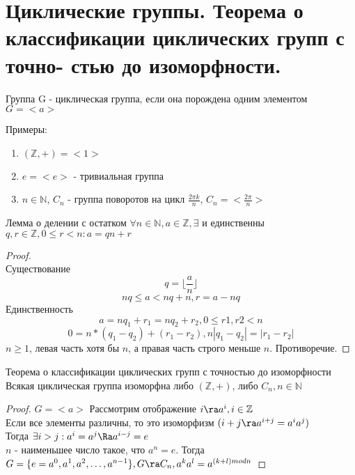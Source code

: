 \section{Циклические группы. Теорема о классификации циклических групп с точно-
стью до изоморфности.}
\begin{Def}
	Группа G - циклическая группа, если она порождена одним элементом
	$G = <a>$
\end{Def}

Примеры:
\begin{enumerate}
	\item $(\mathbb{Z}, +) = <1>$
	\item ${e} = <e>$ - тривиальная группа
	\item $n \in \mathbb{N}$, $C_n$ - группа поворотов на цикл $\frac{2\pi k}{n}$, $C_n = <\frac{2\pi}{n}>$
\end{enumerate}

\begin{theorem}{Лемма о делении с остатком}
	$\forall n \in \mathbb{N}, a \in \mathbb{Z}, \exists$ и единственны $q, r \in \mathbb{Z},  0 \leqslant r < n: a = qn + r$
\end{theorem}
\begin{proof}
\\	Существование
	$$q = \lfloor \frac{a}{n} \rfloor$$
	$$nq \leqslant a < nq + n, r = a - nq$$
	Единственность
	$$a = nq_1 + r_1 = nq_2 + r_2, 0 \leqslant r1, r2 < n$$
	$$0 = n * (q_1 - q_2) + (r_1 - r_2), n|q_1 - q_2| = |r_1 - r_2|$$
	$n \geqslant 1$, левая часть хотя бы $n$, а правая часть строго меньше $n$. Противоречие.
\end{proof}

\begin{theorem}{Теорема о классификации циклических групп с точностью до изоморфности}
	Всякая циклическая группа изоморфна либо $(\mathbb{Z}, +)$, либо $C_n, n \in \mathbb{N}$
\end{theorem}
\begin{proof}
	$G = <a>$
	Рассмотрим отображение $i \ra a^i, i \in \mathbb{Z}$                              \\
	Если все элементы различны, то это изоморфизм $(i + j \ra a^{i+j} = a^i a^j)$ \\
	Тогда $\exists i > j: a^i = a^j \Ra a^{i-j}=e$	                                \\
	$n$ - наименьшее число такое, что $a^n = e$. Тогда $G = \{e = a^0, a^1, a^2, \dots, a^{n-1} \}, G \ra C_n, a^k a^l = a^{(k+l) mod n}$	
\end{proof}


